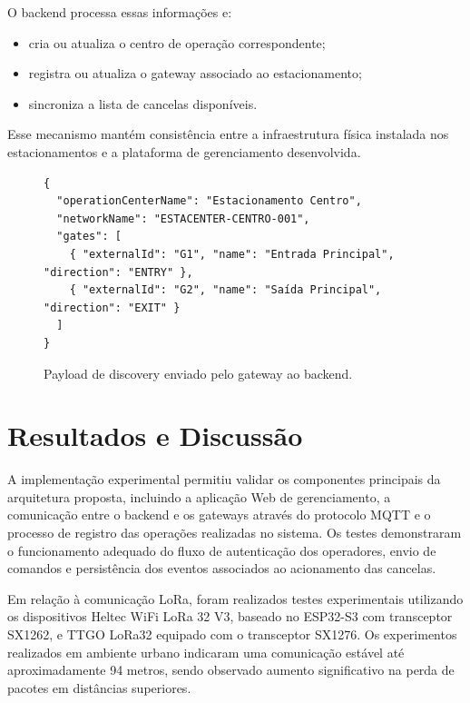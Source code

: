 \documentclass[
article,            %
11pt,               %
twoside,            %
a4paper,            %
section=TITLE,      %
onecolumn,          %
english,            %
brazil,             %
sumario=tradicional
]{abntex2}
\begin{document}
O backend processa essas informações e:
\begin{itemize}
\item cria ou atualiza o centro de operação correspondente;
\item registra ou atualiza o gateway associado ao estacionamento;
\item sincroniza a lista de cancelas disponíveis.
\end{itemize}

Esse mecanismo mantém consistência entre a infraestrutura física instalada nos estacionamentos e a plataforma de gerenciamento desenvolvida.

\begin{figure}[htbp]
\begin{verbatim}
{
  "operationCenterName": "Estacionamento Centro",
  "networkName": "ESTACENTER-CENTRO-001",
  "gates": [
    { "externalId": "G1", "name": "Entrada Principal", "direction": "ENTRY" },
    { "externalId": "G2", "name": "Saída Principal", "direction": "EXIT" }
  ]
}
\end{verbatim}
\caption{Payload de discovery enviado pelo gateway ao backend.}
\label{lst:discovery}
\end{figure}

\FloatBarrier

\section{Resultados e Discussão}

A implementação experimental permitiu validar os componentes principais da arquitetura proposta, incluindo a aplicação Web de gerenciamento, a comunicação entre o backend e os gateways através do protocolo MQTT e o processo de registro das operações realizadas no sistema. Os testes demonstraram o funcionamento adequado do fluxo de autenticação dos operadores, envio de comandos e persistência dos eventos associados ao acionamento das cancelas.

Em relação à comunicação LoRa, foram realizados testes experimentais utilizando os dispositivos Heltec WiFi LoRa 32 V3, baseado no ESP32-S3 com transceptor SX1262, e TTGO LoRa32 equipado com o transceptor SX1276. Os experimentos realizados em ambiente urbano indicaram uma comunicação estável até aproximadamente 94 metros, sendo observado aumento significativo na perda de pacotes em distâncias superiores.
\end{document}
